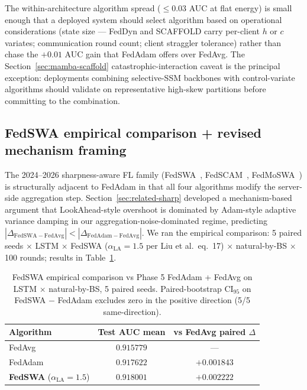 \documentclass[journal]{IEEEtran}
\newcommand{\alphala}{\ensuremath{\alpha_{\mathrm{LA}}}}
\begin{document}
The within-architecture algorithm spread ($\leq 0.03$ AUC at flat energy) is small enough that a deployed system should select algorithm based on operational considerations (state size --- FedDyn and SCAFFOLD carry per-client $h$ or $c$ variates; communication round count; client straggler tolerance) rather than chase the $+0.01$ AUC gain that FedAdam offers over FedAvg. The Section~\ref{sec:mamba-scaffold} catastrophic-interaction caveat is the principal exception: deployments combining selective-SSM backbones with control-variate algorithms should validate on representative high-skew partitions before committing to the combination.

\subsection{FedSWA empirical comparison + revised mechanism framing}\label{sec:why-no-fedswa}

The 2024--2026 sharpness-aware FL family (FedSWA~\cite{Liu2025_FedSWA}, FedSCAM~\cite{FedSCAM2026}, FedMoSWA~\cite{FedMoSWA2025}) is structurally adjacent to FedAdam in that all four algorithms modify the server-side aggregation step. Section~\ref{sec:related-sharp} developed a mechanism-based argument that LookAhead-style overshoot is dominated by Adam-style adaptive variance damping in our aggregation-noise-dominated regime, predicting $|\Delta_{\mathrm{FedSWA} - \mathrm{FedAvg}}| < |\Delta_{\mathrm{FedAdam} - \mathrm{FedAvg}}|$. We ran the empirical comparison: 5 paired seeds $\times$ LSTM $\times$ FedSWA ($\alphala = 1.5$ per Liu et al.\ eq.~17) $\times$ natural-by-BS $\times$ 100 rounds; results in Table~\ref{tab:fedswa-empirical}.

\begin{table}[t]
\caption{FedSWA empirical comparison vs Phase 5 FedAdam + FedAvg on LSTM $\times$ natural-by-BS, 5 paired seeds. Paired-bootstrap CI$_{95}$ on FedSWA $-$ FedAdam excludes zero in the positive direction (5/5 same-direction).}
\label{tab:fedswa-empirical}
\centering
\begin{tabular}{@{}lcc@{}}
\toprule
Algorithm & Test AUC mean & vs FedAvg paired $\Delta$ \\
\midrule
FedAvg              & $0.915779$  & --- \\
FedAdam             & $0.917622$  & $+0.001843$ \\
\textbf{FedSWA} ($\alphala = 1.5$) & $\mathbf{0.918001}$ & $\mathbf{+0.002222}$ \\
\bottomrule
\end{tabular}
\end{table}
\end{document}
